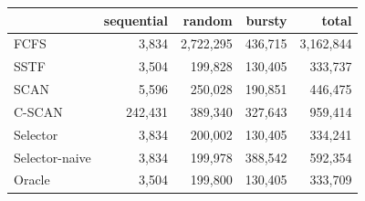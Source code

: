 \begin{tabular}{lrrrr}\toprule
 & sequential & random & bursty & total\\\midrule
FCFS & 3,834 & 2,722,295 & 436,715 & 3,162,844\\
SSTF & 3,504 & 199,828 & 130,405 & 333,737\\
SCAN & 5,596 & 250,028 & 190,851 & 446,475\\
C-SCAN & 242,431 & 389,340 & 327,643 & 959,414\\
Selector & 3,834 & 200,002 & 130,405 & 334,241\\
Selector-naive & 3,834 & 199,978 & 388,542 & 592,354\\
Oracle & 3,504 & 199,800 & 130,405 & 333,709\\
\bottomrule\end{tabular}
